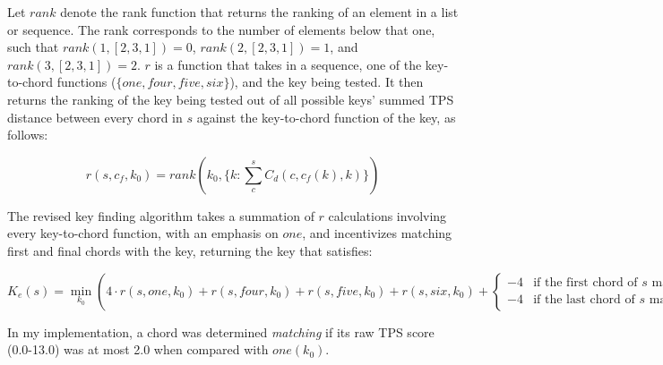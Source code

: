 Let $rank$ denote the rank function that returns the ranking of an element in a list or sequence. The rank corresponds to the number of elements below that one, such that $rank(1, [2,3,1]) = 0$, $rank(2, [2,3,1]) = 1$, and $rank(3, [2,3,1]) = 2$. $r$ is a function that takes in a sequence, one of the key-to-chord functions ($\{one, four, five, six\}$), and the key being tested. It then returns the ranking of the key being tested out of all possible keys' summed TPS distance between every chord in $s$ against the key-to-chord function of the key, as follows:

\[ r(s,{c_f},k_0) = rank(k_0, \{k : \sum_c^s C_d(c,{c_f}(k),k)\}) \]

The revised key finding algorithm takes a summation of $r$ calculations involving every key-to-chord function, with an emphasis on $one$, and incentivizes matching first and final chords with the key, returning the key that satisfies:

\[ K_e(s) = \min_{k_0}\left( 4 \cdot r(s,one,k_0) + r(s,four,k_0) + r(s,five,k_0) + r(s,six,k_0) + \begin{cases} -4 &\text{if the first chord of }s\text{ matches }k_0\text{, and} \\ -4 &\text{if the last chord of }s\text{ matches }k_0 \end{cases} \right) \]

In my implementation, a chord was determined \textit{matching} if its raw TPS score (0.0-13.0) was at most 2.0 when compared with $one(k_0)$.